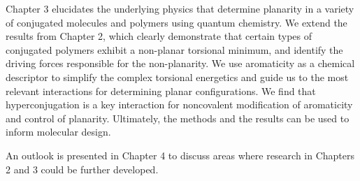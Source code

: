 Chapter 3 elucidates the underlying physics that determine planarity in a variety of conjugated molecules and polymers using quantum chemistry. We extend the results from Chapter 2, which clearly demonstrate that certain types of conjugated polymers exhibit a non-planar torsional minimum, and identify the driving forces responsible for the non-planarity. We use aromaticity as a chemical descriptor to simplify the complex torsional energetics and guide us to the most relevant interactions for determining planar configurations. We find that hyperconjugation is a key interaction for noncovalent modification of aromaticity and control of planarity. Ultimately, the methods and the results can be used to inform molecular design.

An outlook is presented in Chapter 4 to discuss areas where research in Chapters 2 and 3 could be further developed.
